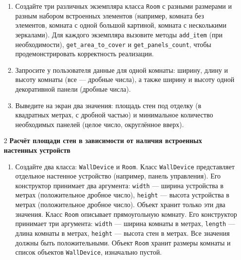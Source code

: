 \begin{enumerate}
\begin{enumerate}
    \item Создайте три различных экземпляра класса \texttt{Room} с разными размерами и разным набором встроенных элементов (например, комната без элементов, комната с одной большой картиной, комната с несколькими зеркалами). Для каждого экземпляра вызовите методы \texttt{add\_item} (при необходимости), \texttt{get\_area\_to\_cover} и \texttt{get\_panels\_count}, чтобы продемонстрировать корректность реализации.

    \item Запросите у пользователя данные для одной комнаты: ширину, длину и высоту комнаты (все — дробные числа), а также ширину и высоту одной декоративной панели (дробные числа).

    \item Выведите на экран два значения: площадь стен под отделку (в квадратных метрах, с дробной частью) и минимальное количество необходимых панелей (целое число, округлённое вверх).
\end{enumerate}

\item[2] \textbf{Расчёт площади стен в зависимости от наличия встроенных настенных устройств}
\begin{enumerate}
    \item Создайте два класса: \texttt{WallDevice} и \texttt{Room}.  
    Класс \texttt{WallDevice} представляет отдельное настенное устройство (например, панель управления). Его конструктор принимает два аргумента:  
    \texttt{width} — ширина устройства в метрах (положительное дробное число),  
    \texttt{height} — высота устройства в метрах (положительное дробное число).  
    Объект хранит только эти два значения.  
    Класс \texttt{Room} описывает прямоугольную комнату. Его конструктор принимает три аргумента:  
    \texttt{width} — ширина комнаты в метрах,  
    \texttt{length} — длина комнаты в метрах,  
    \texttt{height} — высота стен в метрах.  
    Все значения должны быть положительными. Объект \texttt{Room} хранит размеры комнаты и список объектов \texttt{WallDevice}, изначально пустой.


\end{enumerate}
\end{enumerate}

